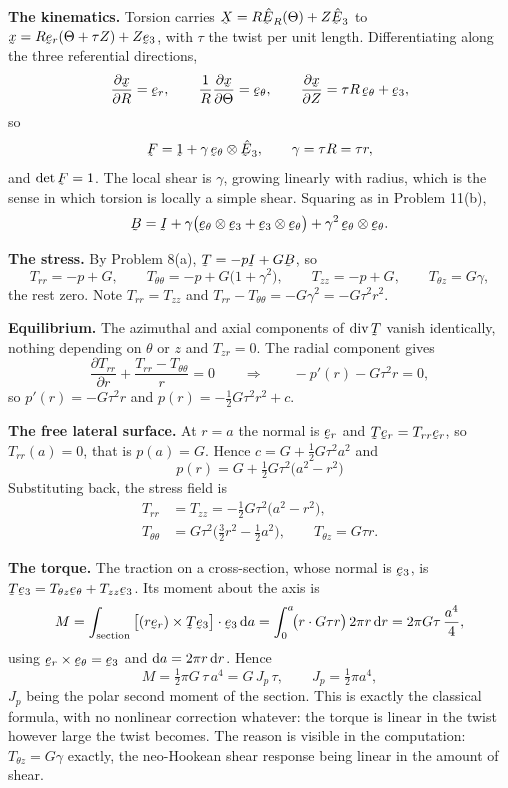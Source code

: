\begin{solution}
\textbf{The kinematics.} Torsion carries $\bX=R\hbE_{R}(\Theta)+Z
\hbE_{3}$ to $\bx=R\ber(\Theta+\tau Z)+Z\be_{3}$, with $\tau$ the twist
per unit length. Differentiating along the three referential
directions,
\[
   \frac{\partial\bx}{\partial R}=\ber,\qquad
   \frac{1}{R}\frac{\partial\bx}{\partial\Theta}=\bet,\qquad
   \frac{\partial\bx}{\partial Z}=\tau R\,\bet+\be_{3},
\]
so
\[
   \bF=\shift+\gamma\,\bet\otimes\hbE_{3},\qquad \gamma=\tau R=\tau r ,
\]
and $\det\bF=1$. The local shear is $\gamma$, growing linearly with
radius, which is the sense in which torsion is locally a simple shear.
Squaring as in Problem 11(b),
\[
   \bB=\I+\gamma\big(\bet\otimes\be_{3}+\be_{3}\otimes\bet\big)
   +\gamma^{2}\,\bet\otimes\bet .
\]

\textbf{The stress.} By Problem 8(a), $\bT=-p\I+G\bB$, so
\[
   T_{rr}=-p+G,\qquad T_{\theta\theta}=-p+G\big(1+\gamma^{2}\big),
   \qquad T_{zz}=-p+G,\qquad T_{\theta z}=G\gamma ,
\]
the rest zero. Note $T_{rr}=T_{zz}$ and
$T_{rr}-T_{\theta\theta}=-G\gamma^{2}=-G\tau^{2}r^{2}$.

\textbf{Equilibrium.} The azimuthal and axial components of $\dvg\bT$
vanish identically, nothing depending on $\theta$ or $z$ and $T_{zr}=0$.
The radial component gives
\[
   \frac{\partial T_{rr}}{\partial r}
   +\frac{T_{rr}-T_{\theta\theta}}{r}=0
   \qquad\Longrightarrow\qquad
   -p'(r)-G\tau^{2}r=0 ,
\]
so $p'(r)=-G\tau^{2}r$ and $p(r)=-\tfrac12G\tau^{2}r^{2}+c$.

\textbf{The free lateral surface.} At $r=a$ the normal is $\ber$ and
$\bT\ber=T_{rr}\ber$, so $T_{rr}(a)=0$, that is $p(a)=G$. Hence
$c=G+\tfrac12G\tau^{2}a^{2}$ and
\[
   \boxed{\;p(r)=G+\tfrac12G\tau^{2}\big(a^{2}-r^{2}\big)\;}
\]
Substituting back, the stress field is
\[
   \boxed{\;
\begin{aligned}
   T_{rr}&=T_{zz}=-\tfrac12G\tau^{2}\big(a^{2}-r^{2}\big),\\
   T_{\theta\theta}&=G\tau^{2}\big(\tfrac32r^{2}-\tfrac12a^{2}\big),
   \qquad T_{\theta z}=G\tau r .
\end{aligned}\;}
\]

\textbf{The torque.} The traction on a cross-section, whose normal is
$\be_{3}$, is $\bT\be_{3}=T_{\theta z}\bet+T_{zz}\be_{3}$. Its moment
about the axis is
\[
   M=\int_{\text{section}}\big[(r\ber)\times\bT\be_{3}\big]
   \cdot\be_{3}\,\dl a
   =\int^{a}_{0}\!\!\big(r\cdot G\tau r\big)\,2\pi r\,\dl r
   =2\pi G\tau\,\frac{a^{4}}{4},
\]
using $\ber\times\bet=\be_{3}$ and $\mathrm{d} a=2\pi r\,\mathrm{d} r$. Hence
\[
   \boxed{\;M=\tfrac12\pi G\,\tau\,a^{4}=G\,J_{p}\,\tau,
   \qquad J_{p}=\tfrac12\pi a^{4} ,\;}
\]
$J_{p}$ being the polar second moment of the section. This is exactly
the classical formula, with no nonlinear correction whatever: the
torque is linear in the twist however large the twist becomes. The
reason is visible in the computation: $T_{\theta z}=G\gamma$ exactly,
the neo-Hookean shear response being linear in the amount of shear.


\end{solution}
